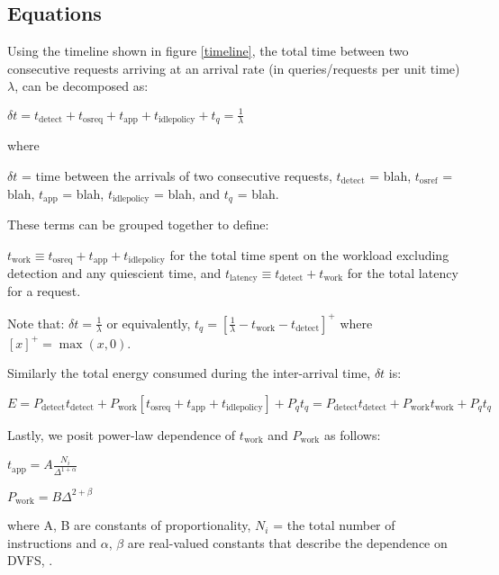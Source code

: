 \label{sec:model}


\subsection{Equations}

Using the timeline shown in figure \ref{timeline}, the total time between two consecutive requests arriving at an arrival rate (in queries/requests per unit time) $\lambda$, can be decomposed as:

$\boxed{\delta t = t_{\text{detect}} + t_{\text{osreq}} + t_{\text{app}} + t_{\text{idlepolicy}} + t_q} = \frac{1}{\lambda}$

where 

$\delta t$ = time between the arrivals of two consecutive requests, $t_{\text{detect}}$ = blah, $t_{\text{osref}}$ = blah, $t_{\text{app}}$ = blah, $t_{\text{idlepolicy}}$ = blah, and $t_q$ = blah.

These terms can be grouped together to define:

$t_{\text{work}} \equiv t_{\text{osreq}} + t_{\text{app}} + t_{\text{idlepolicy}}$ for the total time spent on the workload excluding detection and any quiescient time, and $t_{\text{latency}} \equiv t_{\text{detect}} + t_{\text{work}}$ for the total latency for a request.

Note that: $\delta t = \frac{1}{\lambda}$ or equivalently, $t_q = \left[\frac{1}{\lambda} - t_\text{work} - t_{\text{detect}}\right]^+$ where $[x]^+ = \max(x,0)$.


Similarly the total energy consumed during the inter-arrival time, $\delta t$ is:

$\boxed{E = P_\text{detect} t_{\text{detect}} + P_{\text{work}} \left[t_{\text{osreq}} + t_{\text{app}} + t_{\text{idlepolicy}}\right] + P_q t_q} = P_\text{detect} t_{\text{detect}} + P_{\text{work}} t_{\text{work}} + P_q t_q$

Lastly, we posit power-law dependence of $t_{\text{work}}$ and $P_{\text{work}}$ as follows:

$t_{\text{app}} = A\frac{N_i}{\Delta^{1+\alpha}}$

$P_{\text{work}} = B \Delta^{2+\beta}$

where A, B are constants of proportionality, $N_i$ = the total number of instructions and $\alpha$, $\beta$ are real-valued constants that describe the dependence on DVFS, \Delta.

